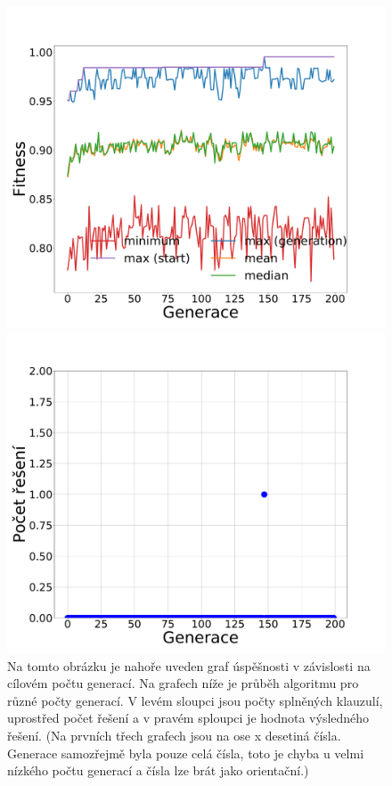\documentclass[11pt]{article}
\begin{document}
\begin{landscape}
\begin{figure}
\begin{minipage}[c]{0.35\textwidth}
        \centering \includegraphics[width=\textwidth]{img/m251g.pdf} 
    \end{minipage}
    \begin{minipage}[c]{0.35\textwidth}
        \centering \includegraphics[width=\textwidth]{img/m251s.pdf} 
    \end{minipage}
   \caption{Na tomto obrázku je nahoře uveden graf úspěšnosti v závislosti na cílovém počtu generací. Na grafech níže je průběh algoritmu pro různé počty generací. V levém sloupci jsou počty splněných klauzulí, uprostřed počet řešení a v pravém sploupci je hodnota výsledného řešení. (Na prvních třech grafech jsou na ose x desetiná čísla. Generace samozřejmě byla pouze celá čísla, toto je chyba u velmi nízkého počtu generací a čísla lze brát jako orientační.)}\label{fig:mut}
\end{figure} 
\end{landscape} 
\end{document}
